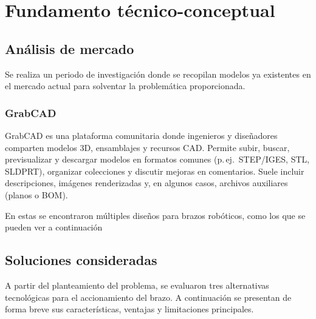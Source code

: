 \section{Fundamento técnico-conceptual}

\subsection{Análisis de mercado}
Se realiza un periodo de investigación donde se recopilan modelos ya existentes en el mercado actual para solventar la problemática proporcionada. 

\subsubsection{GrabCAD}
GrabCAD es una plataforma comunitaria donde ingenieros y diseñadores comparten modelos 3D, ensamblajes y recursos CAD. Permite subir, buscar, previsualizar y descargar modelos en formatos comunes (p.\,ej.\ STEP/IGES, STL, SLDPRT), organizar colecciones y discutir mejoras en comentarios. Suele incluir descripciones, imágenes renderizadas y, en algunos casos, archivos auxiliares (planos o BOM).

En estas se encontraron múltiples diseños para brazos robóticos, como los que se pueden ver a continuación


\subsection{Soluciones consideradas}
A partir del planteamiento del problema, se evaluaron tres alternativas tecnológicas para el accionamiento del brazo. A continuación se presentan de forma breve sus características, ventajas y limitaciones principales.

